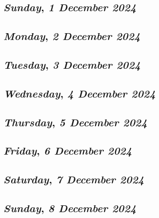 \begin{center}
\section*{\month}
\end{center}

\def\day{\textit{1 December 2024}}
\def\weekday{\textit{Sunday}}
\subsection*{\weekday, \day}

\def\day{\textit{2 December 2024}}
\def\weekday{\textit{Monday}}
\subsection*{\weekday, \day}

\def\day{\textit{3 December 2024}}
\def\weekday{\textit{Tuesday}}
\subsection*{\weekday, \day}

\def\day{\textit{4 December 2024}}
\def\weekday{\textit{Wednesday}}
\subsection*{\weekday, \day}

\def\day{\textit{5 December 2024}}
\def\weekday{\textit{Thursday}}
\subsection*{\weekday, \day}

\def\day{\textit{6 December 2024}}
\def\weekday{\textit{Friday}}
\subsection*{\weekday, \day}

\def\day{\textit{7 December 2024}}
\def\weekday{\textit{Saturday}}
\subsection*{\weekday, \day}

\def\day{\textit{8 December 2024}}
\def\weekday{\textit{Sunday}}
\subsection*{\weekday, \day}

